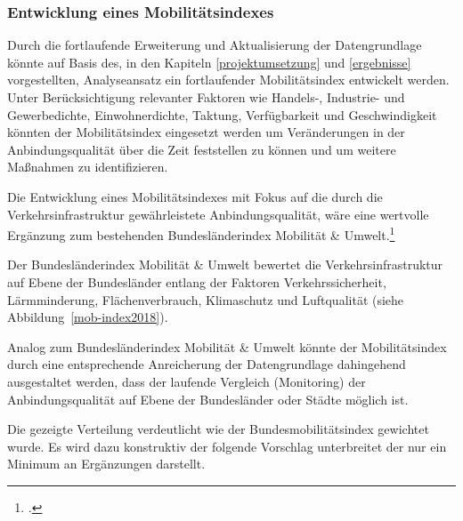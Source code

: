 \subsubsection{Entwicklung eines Mobilitätsindexes}\label{mobwob_index}
Durch die fortlaufende Erweiterung und Aktualisierung der Datengrundlage könnte auf Basis des, in den Kapiteln \ref{projektumsetzung} und \ref{ergebnisse} vorgestellten, Analyseansatz ein fortlaufender Mobilitätsindex entwickelt werden. Unter Berücksichtigung relevanter Faktoren wie Handels-, Industrie- und Gewerbedichte, Einwohnerdichte, Taktung, Verfügbarkeit und Geschwindigkeit könnten der Mobilitätsindex eingesetzt werden um Veränderungen in der Anbindungsqualität über die Zeit feststellen zu können und um weitere Maßnahmen zu identifizieren. 

Die Entwicklung eines Mobilitätsindexes mit Fokus auf die durch die Verkehrsinfrastruktur gewährleistete Anbindungsqualität, wäre eine wertvolle Ergänzung zum bestehenden Bundesländerindex Mobilität \& Umwelt.\footcite{Bundeslaenderindex:1}

Der Bundesländerindex Mobilität \& Umwelt bewertet die Verkehrsinfrastruktur auf Ebene der Bundesländer entlang der Faktoren Verkehrssicherheit, Lärmminderung, Flächenverbrauch, Klimaschutz und Luftqualität (siehe Abbildung~\ref{mob-index2018}).


Analog zum Bundesländerindex Mobilität \& Umwelt könnte der Mobilitätsindex durch eine entsprechende Anreicherung der Datengrundlage dahingehend ausgestaltet werden, dass der laufende Vergleich (Monitoring) der Anbindungsqualität auf Ebene der Bundesländer oder Städte möglich ist.


Die gezeigte Verteilung verdeutlicht wie der Bundesmobilitätsindex gewichtet wurde. Es wird dazu konstruktiv der folgende Vorschlag unterbreitet der nur ein Minimum an Ergänzungen darstellt.


